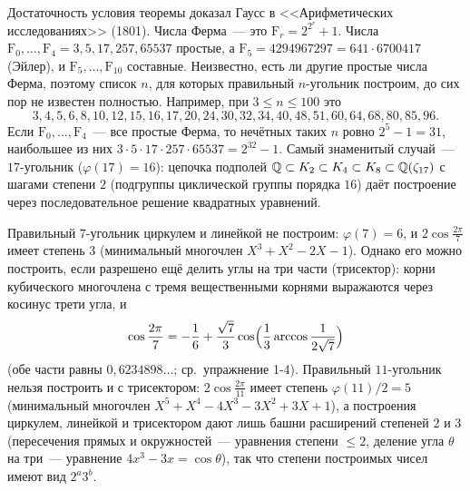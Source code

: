 \begin{remark}[5.13]
Достаточность условия теоремы  доказал Гаусс в <<Арифметических исследованиях>> (1801). Числа Ферма~--- это
$\mathrm F_r=2^{2^r}+1$. Числа $\mathrm F_0,\dots,\mathrm F_4=3,5,17,257,65537$ простые, а
$\mathrm F_5=4294967297=641\cdot6700417$ (Эйлер), и $\mathrm F_5,\dots,\mathrm F_{10}$ составные. Неизвестно, есть ли другие простые числа Ферма, поэтому список $n$, для которых правильный
$n$-угольник построим, до сих пор не известен полностью. Например, при $3\le n\le100$ это
\[
3,4,5,6,8,10,12,15,16,17,20,24,30,32,34,40,48,51,60,64,68,80,85,96 .
\]
Если $\mathrm F_0,\dots,\mathrm F_4$~--- все простые Ферма, то нечётных таких $n$ ровно $2^5-1=31$, наибольшее из них
$3\cdot5\cdot17\cdot257\cdot65537=2^{32}-1$. Самый знаменитый случай~--- $17$-угольник ($\varphi(17)=16$): цепочка подполей
$\mathbb Q\subset K_2\subset K_4\subset K_8\subset\mathbb Q(\zeta_{17})$ с шагами степени $2$ (подгруппы циклической группы порядка $16$)
даёт построение через последовательное решение квадратных уравнений.
\end{remark}

\begin{remark}
Правильный $7$-угольник циркулем и линейкой не построим: $\varphi(7)=6$, и $2\cos\frac{2\pi}7$ имеет степень $3$ (минимальный
многочлен $X^3+X^2-2X-1$). Однако его можно построить, если разрешено ещё делить углы на три части (трисектор): корни
кубического многочлена с тремя вещественными корнями выражаются через косинус трети угла, и
\[
\cos\frac{2\pi}7=-\frac16+\frac{\sqrt7}3\cos\Bigl(\frac13\arccos\frac1{2\sqrt7}\Bigr)
\]
(обе части равны $0{,}6234898\ldots$; ср.\ упражнение 1-4). Правильный $11$-угольник нельзя построить и
с трисектором: $2\cos\frac{2\pi}{11}$ имеет степень $\varphi(11)/2=5$ (минимальный многочлен $X^5+X^4-4X^3-3X^2+3X+1$), а
построения циркулем, линейкой и трисектором дают лишь башни расширений степеней $2$ и $3$ (пересечения прямых и окружностей~---
уравнения степени $\le2$, деление угла $\theta$ на три~--- уравнение $4x^3-3x=\cos\theta$), так что степени построимых чисел
имеют вид $2^a3^b$.
\end{remark}
